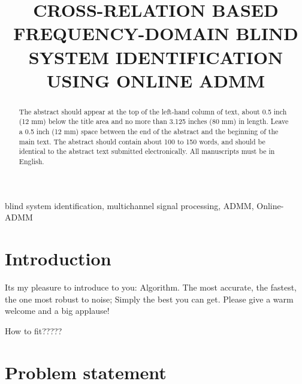 \documentclass{article}
\title{CROSS-RELATION BASED FREQUENCY-DOMAIN BLIND SYSTEM IDENTIFICATION USING ONLINE ADMM}
\begin{document}
%
\maketitle
%
\begin{abstract}
The abstract should appear at the top of the left-hand column of text, about 0.5 inch (12 mm) below the title area and no more than 3.125 inches (80 mm) in length.
Leave a 0.5 inch (12 mm) space between the end of the abstract and the beginning of the main text.
The abstract should contain about 100 to 150 words, and should be identical to the abstract text submitted electronically.
All manuscripts must be in English.
\end{abstract}
%
\begin{keywords}
blind system identification, multichannel signal processing, ADMM, Online-ADMM
\end{keywords}
%
\section{Introduction}
\label{sec:intro}

Its my pleasure to introduce to you: Algorithm. The most accurate, the fastest, the one most robust to noise; Simply the best you can get. Please give a warm welcome and a big applause!
\begin{attention}
    How to fit?????
\end{attention}


\section{Problem statement}
\label{sec:problem_statement}


\end{document}
